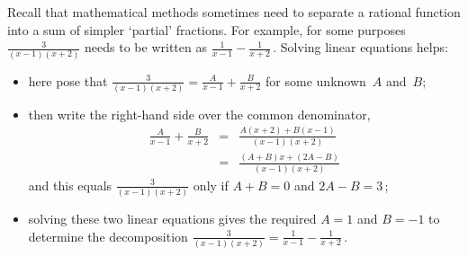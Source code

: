 \begin{example} \label{eg:}
Recall that mathematical methods sometimes need to separate a rational function into a sum of simpler `partial' fractions.  
For example, for some purposes\(\frac3{(x-1)(x+2)}\) needs to be written as \(\frac1{x-1}-\frac1{x+2}\)\,.  
Solving linear equations helps: \begin{itemize}
\item here  pose that \(\frac3{(x-1)(x+2)} = \frac A{x-1}+\frac B{x+2}\) for some unknown~\(A\) and~\(B\); 
\item then write the right-hand side over the common denominator,
\begin{eqnarray*}
\frac A{x-1}+\frac B{x+2}
&=&\frac{A(x+2)+B(x-1)}{(x-1)(x+2)}
\\&=&\frac{(A+B)x+(2A-B)}{(x-1)(x+2)}
\end{eqnarray*}
and this equals \(\frac3{(x-1)(x+2)}\) only if \(A+B=0\) and \(2A-B=3\)\,; 
\item solving these two linear equations gives the required \(A=1\) and \(B=-1\) to determine the decomposition \(\frac3{(x-1)(x+2)}=\frac1{x-1}-\frac1{x+2}\)\,.
\end{itemize}



\end{example}
